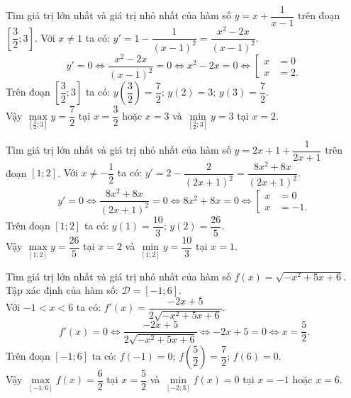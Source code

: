 \begin{bt}%
	Tìm giá trị lớn nhất và giá trị nhỏ nhất của hàm số $y = x + \dfrac{1}{x-1}$ trên đoạn $\left[ \dfrac{3}{2};3 \right]$.
	\loigiai
	{
		Với $x \neq 1$ ta có: $y' = 1 - \dfrac{1}{(x-1)^2} = \dfrac{x^2 - 2x}{(x-1)^2}$.
		$$y' = 0 \Leftrightarrow \dfrac{x^2 - 2x}{(x-1)^2} = 0 \Leftrightarrow x^2 - 2x = 0 \Leftrightarrow \left[ \begin{array}{ll} x &= 0 \\ x &= 2. \end{array} \right.$$
		Trên đoạn $\left[ \dfrac{3}{2};3 \right]$ ta có: $y\left( \dfrac{3}{2} \right) = \dfrac{7}{2}; \, y(2) = 3; \, y(3) = \dfrac{7}{2}$.\\
		Vậy $\max\limits_{\left[ \frac{3}{2};3 \right]} y = \dfrac{7}{2}$ tại $x = \dfrac{3}{2}$ hoặc $x = 3$ và $\min\limits_{\left[ \frac{3}{2};3 \right]} y = 3$ tại $x = 2$.
	}
\end{bt}


\begin{bt}%
	Tìm giá trị lớn nhất và giá trị nhỏ nhất của hàm số $y = 2x + 1 + \dfrac{1}{2x+1}$ trên đoạn $\left[ 1;2 \right]$.
	\loigiai
	{
		Với $x \neq -\dfrac{1}{2}$ ta có: $y' = 2 - \dfrac{2}{(2x+1)^2} = \dfrac{8x^2 + 8x}{(2x+1)^2}$.
		$$y' = 0 \Leftrightarrow \dfrac{8x^2 + 8x}{(2x+1)^2} = 0 \Leftrightarrow 8x^2 + 8x = 0 \Leftrightarrow \left[ \begin{array}{ll} x &= 0 \\ x &= -1. \end{array} \right.$$
		Trên đoạn $\left[ 1;2 \right]$ ta có: $y\left( 1 \right) = \dfrac{10}{3}; \, y(2) = \dfrac{26}{5}$.\\
		Vậy $\max\limits_{\left[ 1;2 \right]} y = \dfrac{26}{5}$ tại $x = 2$ và $\min\limits_{\left[ 1;2 \right]} y = \dfrac{10}{3}$ tại $x = 1$.
	}
\end{bt}


\begin{bt}%
	Tìm giá trị lớn nhất và giá trị nhỏ nhất của hàm số $f(x) = \sqrt{-x^2 + 5x + 6}$.
	\loigiai
	{
		Tập xác định của hàm số: $\mathscr{D} = [-1;6]$.\\
		Với $-1 < x < 6$ ta có: $f'(x) = \dfrac{-2x + 5}{2\sqrt{-x^2 + 5x + 6}}$.\\
		$$f'(x) = 0 \Leftrightarrow \dfrac{-2x + 5}{2\sqrt{-x^2 + 5x + 6}} \Leftrightarrow -2x + 5 = 0 \Leftrightarrow x = \dfrac{5}{2}.$$
		Trên đoạn $[-1;6]$ ta có: $f(-1) = 0; \, f\left( \dfrac{5}{2} \right) = \dfrac{7}{2}; \, f(6) = 0$.\\
		Vậy $\max\limits_{[-1;6]} f(x) = \dfrac{6}{2}$ tại $x = \dfrac{5}{2}$ và $\min\limits_{[-2;3]} f(x) = 0$ tại $x = -1$ hoặc $x = 6$.
	}
\end{bt}


